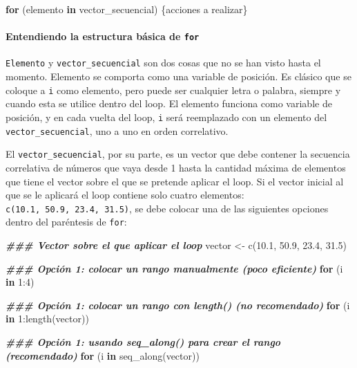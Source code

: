 \documentclass[
]{article}
\newenvironment{Shaded}{\begin{snugshade}}{\end{snugshade}}
\newcommand{\ControlFlowTok}[1]{\textcolor[rgb]{0.13,0.29,0.53}{\textbf{#1}}}
\newcommand{\DecValTok}[1]{\textcolor[rgb]{0.00,0.00,0.81}{#1}}
\newcommand{\DocumentationTok}[1]{\textcolor[rgb]{0.56,0.35,0.01}{\textbf{\textit{#1}}}}
\newcommand{\FloatTok}[1]{\textcolor[rgb]{0.00,0.00,0.81}{#1}}
\newcommand{\FunctionTok}[1]{\textcolor[rgb]{0.00,0.00,0.00}{#1}}
\newcommand{\NormalTok}[1]{#1}
\newcommand{\OtherTok}[1]{\textcolor[rgb]{0.56,0.35,0.01}{#1}}
\newcommand{\SpecialCharTok}[1]{\textcolor[rgb]{0.00,0.00,0.00}{#1}}
\theoremstyle{definition}
\theoremstyle{definition}
\theoremstyle{definition}
\theoremstyle{definition}
\theoremstyle{remark}
\begin{document}
\begin{Shaded}
\begin{Highlighting}[]
\ControlFlowTok{for}\NormalTok{ (elemento }\ControlFlowTok{in}\NormalTok{ vector\_secuencial) \{acciones a realizar\}}
\end{Highlighting}
\end{Shaded}

\hypertarget{entendiendo-la-estructura-buxe1sica-de-for}{%
\paragraph{\texorpdfstring{Entendiendo la estructura básica de \texttt{for}}{Entendiendo la estructura básica de for}}\label{entendiendo-la-estructura-buxe1sica-de-for}}

\texttt{Elemento} y \texttt{vector\_secuencial} son dos cosas que no se han visto hasta el momento. Elemento se comporta como una variable de posición. Es clásico que se coloque a \texttt{i} como elemento, pero puede ser cualquier letra o palabra, siempre y cuando esta se utilice dentro del loop. El elemento funciona como variable de posición, y en cada vuelta del loop, \texttt{i} será reemplazado con un elemento del \texttt{vector\_secuencial}, uno a uno en orden correlativo.

El \texttt{vector\_secuencial}, por su parte, es un vector que debe contener la secuencia correlativa de números que vaya desde 1 hasta la cantidad máxima de elementos que tiene el vector sobre el que se pretende aplicar el loop. Si el vector inicial al que se le aplicará el loop contiene solo cuatro elementos: \texttt{c(10.1,\ 50.9,\ 23.4,\ 31.5)}, se debe colocar una de las siguientes opciones dentro del paréntesis de \texttt{for}:

\begin{Shaded}
\begin{Highlighting}[]
\DocumentationTok{\#\#\# Vector sobre el que aplicar el loop}
\NormalTok{vector }\OtherTok{\textless{}{-}} \FunctionTok{c}\NormalTok{(}\FloatTok{10.1}\NormalTok{, }\FloatTok{50.9}\NormalTok{, }\FloatTok{23.4}\NormalTok{, }\FloatTok{31.5}\NormalTok{)}
\end{Highlighting}
\end{Shaded}

\begin{Shaded}
\begin{Highlighting}[]
\DocumentationTok{\#\#\# Opción 1: colocar un rango manualmente (poco eficiente)}
\ControlFlowTok{for}\NormalTok{ (i }\ControlFlowTok{in} \DecValTok{1}\SpecialCharTok{:}\DecValTok{4}\NormalTok{)}

\DocumentationTok{\#\#\# Opción 1: colocar un rango con length() (no recomendado)}
\ControlFlowTok{for}\NormalTok{ (i }\ControlFlowTok{in} \DecValTok{1}\SpecialCharTok{:}\FunctionTok{length}\NormalTok{(vector))}

\DocumentationTok{\#\#\# Opción 1: usando seq\_along() para crear el rango (recomendado)}
\ControlFlowTok{for}\NormalTok{ (i }\ControlFlowTok{in} \FunctionTok{seq\_along}\NormalTok{(vector))}
\end{Highlighting}
\end{Shaded}
\end{document}
